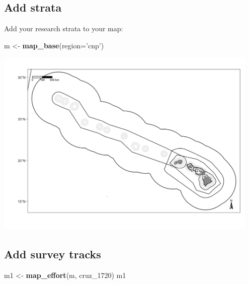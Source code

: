 \documentclass[
]{book}
\newenvironment{Shaded}{\begin{snugshade}}{\end{snugshade}}
\newcommand{\DataTypeTok}[1]{\textcolor[rgb]{0.13,0.29,0.53}{#1}}
\newcommand{\DecValTok}[1]{\textcolor[rgb]{0.00,0.00,0.81}{#1}}
\newcommand{\KeywordTok}[1]{\textcolor[rgb]{0.13,0.29,0.53}{\textbf{#1}}}
\newcommand{\NormalTok}[1]{#1}
\newcommand{\OperatorTok}[1]{\textcolor[rgb]{0.81,0.36,0.00}{\textbf{#1}}}
\newcommand{\StringTok}[1]{\textcolor[rgb]{0.31,0.60,0.02}{#1}}
\begin{document}
\hypertarget{add-strata}{%
\subsection*{Add strata}\label{add-strata}}

Add your research strata to your map:

\begin{Shaded}
\begin{Highlighting}[]
\NormalTok{m <-}\StringTok{ }\KeywordTok{map_base}\NormalTok{(}\DataTypeTok{region=}\StringTok{'cnp'}\NormalTok{)}
\end{Highlighting}
\end{Shaded}

\begin{Shaded}
\end{Shaded}

\includegraphics[width=0.95\textwidth,height=\textheight]{img/map_cnp_strata.png}

\hypertarget{add-survey-tracks}{%
\subsection*{Add survey tracks}\label{add-survey-tracks}}

\begin{Shaded}
\begin{Highlighting}[]
\NormalTok{m1 <-}\StringTok{ }\KeywordTok{map_effort}\NormalTok{(m, cruz_}\DecValTok{1720}\NormalTok{)}
\NormalTok{m1}
\end{Highlighting}
\end{Shaded}
\end{document}
